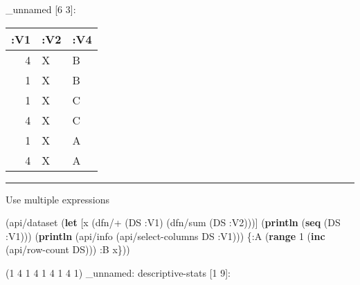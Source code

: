 \documentclass[]{article}
\newenvironment{Shaded}{\begin{snugshade}}{\end{snugshade}}
\newcommand{\KeywordTok}[1]{\textcolor[rgb]{0.13,0.29,0.53}{\textbf{#1}}}
\newcommand{\DecValTok}[1]{\textcolor[rgb]{0.00,0.00,0.81}{#1}}
\newcommand{\AttributeTok}[1]{\textcolor[rgb]{0.77,0.63,0.00}{#1}}
\newcommand{\NormalTok}[1]{#1}
\begin{document}
\_unnamed {[}6 3{]}:

\begin{longtable}[]{@{}rll@{}}
\toprule
:V1 & :V2 & :V4\tabularnewline
\midrule
\endhead
4 & X & B\tabularnewline
1 & X & B\tabularnewline
1 & X & C\tabularnewline
4 & X & C\tabularnewline
1 & X & A\tabularnewline
4 & X & A\tabularnewline
\bottomrule
\end{longtable}

\begin{center}\rule{0.5\linewidth}{0.5pt}\end{center}

Use multiple expressions

\begin{Shaded}
\begin{Highlighting}[]
\NormalTok{(api/dataset (}\KeywordTok{let}\NormalTok{ [x (dfn/+ (DS }\AttributeTok{:V1}\NormalTok{) (dfn/sum (DS }\AttributeTok{:V2}\NormalTok{)))]}
\NormalTok{               (}\KeywordTok{println}\NormalTok{ (}\KeywordTok{seq}\NormalTok{ (DS }\AttributeTok{:V1}\NormalTok{)))}
\NormalTok{               (}\KeywordTok{println}\NormalTok{ (api/info (api/select-columns DS }\AttributeTok{:V1}\NormalTok{)))}
\NormalTok{               \{}\AttributeTok{:A}\NormalTok{ (}\KeywordTok{range} \DecValTok{1}\NormalTok{ (}\KeywordTok{inc}\NormalTok{ (api/row-count DS)))}
                \AttributeTok{:B}\NormalTok{ x\}))}
\end{Highlighting}
\end{Shaded}

(1 4 1 4 1 4 1 4 1) \_unnamed: descriptive-stats {[}1 9{]}:
\end{document}
